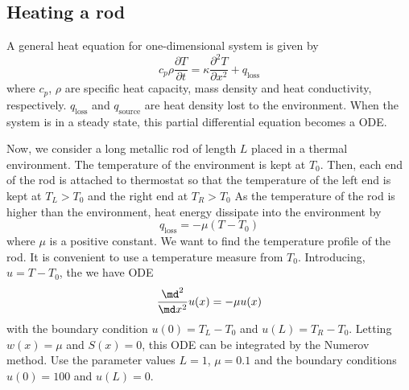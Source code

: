 \subsection{Heating a rod}

A general heat equation for one-dimensional system is given by
\begin{equation}
c_p \rho \frac{\partial T}{\partial t} = \kappa \frac{\partial^2 T}{\partial x^2} + q_\text{loss}
\end{equation}
where $c_p$, $\rho$ are specific heat capacity, mass density and heat conductivity, respectively.  $q_\text{loss}$ and $q_\text{source}$ are heat density lost to the environment. When the system is in a steady state, this partial differential equation becomes a ODE.

Now, we consider a long metallic rod of length $L$ placed in a thermal environment.  The temperature of the environment is kept at $T_0$.
Then, each end of the rod is attached to thermostat so that the temperature of the left end is kept at $T_L>T_0$ and the right end at $T_R >T_0$  As the temperature of the rod is higher than the environment, heat energy dissipate into the environment by
\begin{equation}
q_\text{loss} = - \mu (T - T_0)
\end{equation}
where $\mu$ is a positive constant.   We want to find the temperature profile of the rod.   It is convenient to use a temperature measure from $T_0$.  Introducing, $u=T-T_0$, the we have ODE 
\begin{equation}
\frac{\md ^2}{\md x^2} u(x) = - \mu u(x)
\end{equation}
with the boundary condition  $u(0)=T_L-T_0$ and $u(L)=T_R-T_0$.  Letting $w(x)=\mu$ and $S(x)=0$, this ODE can be integrated by the Numerov method.
Use the parameter values $L=1$, $\mu=0.1$ and the boundary conditions $u(0)=100$ and $u(L)=0$.